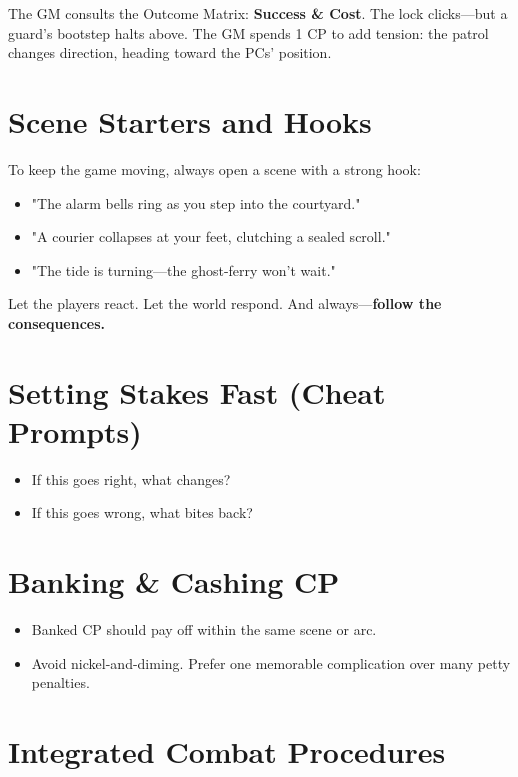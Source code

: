 The GM consults the Outcome Matrix: \textbf{Success \& Cost}. The lock clicks—but a guard's bootstep halts above. The GM spends 1 CP to add tension: the patrol changes direction, heading toward the PCs' position.

\section*{Scene Starters and Hooks}

To keep the game moving, always open a scene with a strong hook:

\begin{itemize}
    \item "The alarm bells ring as you step into the courtyard."
    \item "A courier collapses at your feet, clutching a sealed scroll."
    \item "The tide is turning—the ghost-ferry won't wait."
\end{itemize}

Let the players react. Let the world respond. And always—\textbf{follow the consequences.}

\section*{Setting Stakes Fast (Cheat Prompts)}

\begin{itemize}
    \item If this goes right, what changes?
    \item If this goes wrong, what bites back?
\end{itemize}

\section*{Banking \& Cashing CP}

\begin{itemize}
    \item Banked CP should pay off within the same scene or arc.
    \item Avoid nickel-and-diming. Prefer one memorable complication over many petty penalties.
\end{itemize}

\section*{Integrated Combat Procedures}

